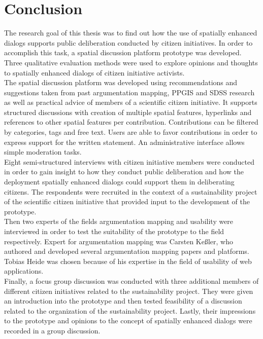 \section{Conclusion}
\label{chap:conclusion}
The research goal of this thesis was to find out how the use of spatially enhanced dialogs supports public deliberation conducted by citizen initiatives. In order to accomplish this task, a spatial discussion platform prototype was developed. Three qualitative evaluation methods were used to explore opinions and thoughts to spatially enhanced dialogs of citizen initiative activists.\\
The spatial discussion platform was developed using recommendations and suggestions taken from past argumentation mapping, PPGIS and SDSS research as well as practical advice of members of a scientific citizen initiative. It supports structured discussions with creation of multiple spatial features, hyperlinks and references to other spatial features per contribution. Contributions can be filtered by categories, tags and free text. Users are able to favor contributions in order to express support for the written statement. An administrative interface allows simple moderation tasks.\\
Eight semi-structured interviews with citizen initiative members were conducted in order to gain insight to how they conduct public deliberation and how the deployment spatially enhanced dialogs could support them in deliberating citizens. The respondents were recruited in the context of a sustainability project of the scientific citizen initiative that provided input to the development of the prototype.\\
Then two experts of the fields argumentation mapping and usability were interviewed in order to test the suitability of the prototype to the field respectively. Expert for argumentation mapping was Carsten Keßler, who authored and developed several argumentation mapping papers and platforms. Tobias Heide was chosen because of his expertise in the field of usability of web applications.\\
Finally, a focus group discussion was conducted with three additional members of different citizen initiatives related to the sustainability project. They were given an introduction into the prototype and then tested feasibility of a discussion related to the organization of the sustainability project. Lastly, their impressions to the prototype and opinions to the concept of spatially enhanced dialogs were recorded in a group discussion.\\
